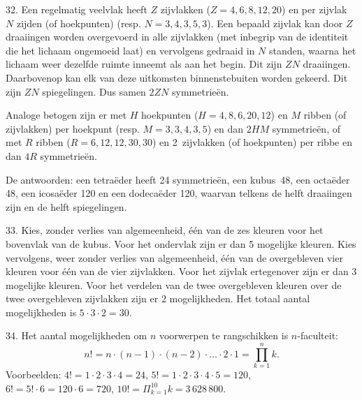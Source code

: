 \begin{problem}{32.}
	Een regelmatig veelvlak heeft $Z$ zijvlakken ($Z = 4,6,8,12,20$) en per zijvlak $N$ zijden (of hoekpunten) (resp. $N = 3,4,3,5,3$). Een bepaald zijvlak kan door $Z$ draaiingen worden overgevoerd in alle zijvlakken (met inbegrip van de identiteit die het lichaam ongemoeid laat) en vervolgens gedraaid in $N$ standen, waarna het lichaam weer dezelfde ruimte inneemt als aan het begin. Dit zijn $Z N$ draaiingen. Daarbovenop kan elk van deze uitkomsten binnenstebuiten worden gekeerd. Dit zijn $Z N$ spiegelingen. Dus samen $2 Z N$ symmetrieën.

    Analoge betogen zijn er met $H$ hoekpunten ($H = 4,8,6,20,12$) en $M$ ribben (of zijvlakken) per hoekpunt (resp. $M = 3,3,4,3,5$) en dan $2 H M$ symmetrieën, of met $R$ ribben ($R = 6,12,12,30,30$) en 2~zijvlakken (of hoekpunten) per ribbe en dan $4 R$ symmetrieën.

    De antwoorden: een tetraëder heeft 24 symmetrieën, een kubus~48, een octaëder 48, een icosaëder 120 en een dodecaëder 120, waarvan telkens de helft draaiingen zijn en de helft spiegelingen.
\end{problem}

\clearpage

\begin{problem}{33.}
    Kies, zonder verlies van algemeenheid, één van de zes kleuren voor het bovenvlak van de kubus. Voor het ondervlak zijn er dan 5 mogelijke kleuren. Kies vervolgens, weer zonder verlies van algemeen\-heid, één van de overgebleven vier kleuren voor één van de vier zij\-vlakken. Voor het zijvlak ertegenover zijn er dan 3 mogelijke kleuren. Voor het verdelen van de twee overgebleven kleuren over de twee overgebleven zijvlakken zijn er 2 mogelijkheden. Het totaal aantal mogelijkheden is $5 \cdot 3 \cdot 2 = 30$.
\end{problem}

\begin{problem}{34.}
    Het aantal mogelijkheden om $n$ voorwerpen te rangschikken is $n$-faculteit:
    \begin{equation*}
        n! = n \cdot (n - 1) \cdot (n - 2) \cdot \dots \cdot 2 \cdot 1 = \textstyle\prod\limits_{k=1}^{n} k.
    \end{equation*}
    Voorbeelden: $4! = 1 \cdot 2 \cdot 3 \cdot 4 = 24$, $5! = 1 \cdot 2 \cdot 3 \cdot 4 \cdot 5 = 120$, $6! = 5! \cdot 6 = 120 \cdot 6 = 720$, $10! = \Pi_{k=1}^{10} k = 3\,628\,800$.
\end{problem}

